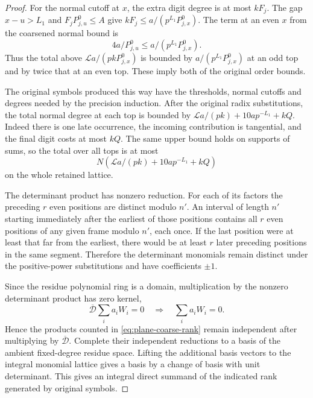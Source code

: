 \begin{proof}
For the normal cutoff at \(x\), the extra digit degree is at
most \(kF_j\). The gap \(x-u>L_1\) and \(F_jP^0_{j,u}\le A\)
give \(kF_j\le a/(p^{L_1}P^0_{j,x})\). The term at an even
\(x\) from the coarsened normal bound is
\[
 4a/P^0_{j,u}\le a/(p^{L_1}P^0_{j,x}).
\]
Thus the total
above \(\mathcal L a/(pkP^0_{j,x})\) is bounded by
\(a/(p^{L_1}P^0_{j,x})\) at an odd top and by twice that at
an even top. These imply both of the original order bounds.

The original symbols produced this way have the thresholds,
normal cutoffs and degrees needed by the precision induction.
After the original radix substitutions, the total normal
degree at each top is bounded by
\(\mathcal L a/(pk)+10a p^{-L_1}+kQ\). Indeed there is one
late occurrence, the incoming contribution is tangential,
and the final digit costs at most \(kQ\). The same upper bound
holds on supports of sums, so the total over all tops is at
most
\[
 N(\mathcal L a/(pk)+10a p^{-L_1}+kQ)
\]
on the whole
retained lattice.

The determinant product has nonzero reduction. For each of
its factors the preceding \(r\) even positions are distinct
modulo \(n'\). An interval of length \(n'\) starting immediately
after the earliest of those positions contains all \(r\) even
positions of any given frame modulo \(n'\), each once. If the
last position were at least that far from the earliest, there
would be at least \(r\) later preceding positions in the same
segment. Therefore the determinant monomials remain distinct
under the positive-power substitutions and have coefficients
\(\pm1\).

Since the residue polynomial ring is a domain, multiplication by the nonzero determinant product has zero kernel,
\[
 \overline{\mathcal D}\sum_i a_iW_i=0\quad\Longrightarrow\quad\sum_i a_iW_i=0.
\]
Hence the
products counted in \eqref{eq:plane-coarse-rank} remain independent
after multiplying by \(\overline{\mathcal D}\). Complete their
independent reductions to a basis of the ambient fixed-degree
residue space. Lifting the additional basis vectors to the
integral monomial lattice gives a basis by a change of basis
with unit determinant. This gives an integral direct summand
of the indicated rank generated by original symbols.
\end{proof}
